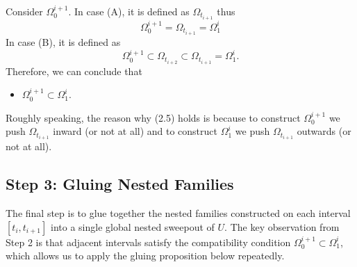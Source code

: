 Consider $\Omega_{0}^{i + 1}$. In case (A), it is defined as $\Omega_{t_{i + 1}}$ thus
\begin{equation*}
    \Omega_{0}^{i + 1} = \Omega_{t_{i + 1}} = \Omega_1^i
\end{equation*}
In case (B), it is defined as
\begin{equation*}
    \Omega_{0}^{i + 1} \subset \Omega_{t_{i + 2}} \subset \Omega_{t_{i + 1}} = \Omega_1^i.
\end{equation*}
Therefore, we can conclude that
\begin{itemize}
    \item[(2.5)] $\Omega_0^{i + 1}\subset \Omega_1^i$.
\end{itemize}
Roughly speaking, the reason why (2.5) holds is because to construct $\Omega_0^{i + 1}$ we push $\Omega_{t_{i + 1}}$ inward (or not at all) and to construct $\Omega_1^{i}$ we push $\Omega_{t_{i + 1}}$ outwards (or not at all).
\subsection{Step 3: Gluing Nested Families}

The final step is to glue together the nested families constructed on each interval $[t_i, t_{i+1}]$
into a single global nested sweepout of $U$. The key observation from Step 2 is that adjacent
intervals satisfy the compatibility condition $\Omega_0^{i+1} \subset \Omega_1^i$, which allows us
to apply the gluing proposition below repeatedly.

